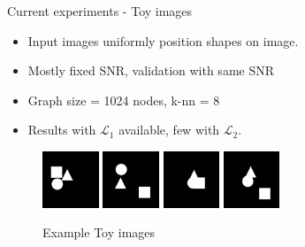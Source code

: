 \documentclass[aspectratio=169]{beamer}
\begin{document}
\begin{frame}{Current experiments - Toy images}
    \begin{itemize}
        \item Input images uniformly position shapes on image.
        \item Mostly fixed SNR, validation with same SNR
        \item Graph size = 1024 nodes, k-nn = 8
        \item Results with $\mathcal{L}_1$ available, few with $\mathcal{L}_2$.
    \end{itemize}

    \begin{figure}
        \includegraphics[width=0.15\textwidth]{toyimage_01}
        \includegraphics[width=0.15\textwidth]{toyimage_02}
        \includegraphics[width=0.15\textwidth]{toyimage_03}
        \includegraphics[width=0.15\textwidth]{toyimage_04}
        \caption{Example Toy images}
    \end{figure}
    
\end{frame}
\end{document}
